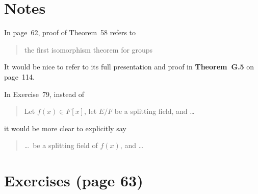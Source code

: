 
\section{Notes}

In page~62, proof of Theorem~58 refers to
\begin{quotation}
the first isomorphism theorem for groups
\end{quotation}
It would be nice to refer to its full presentation and proof
in \textbf{Theorem~G.5} on page~114.

In Exercise~79, instead of
\begin{quotation}
Let \(f(x)\in F[x]\), let \(E/F\) be a splitting field, and \ldots
\end{quotation}
it would be more clear to explicitly say
\begin{quotation}
\ldots\ be a splitting field of \(f(x)\), and \ldots
\end{quotation}


\section{Exercises (page 63)}

